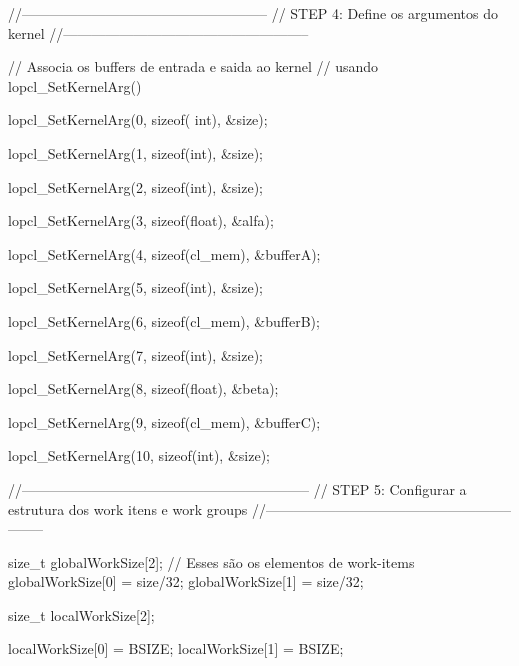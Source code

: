 \begin{DoxyCodeInclude}
{{{{{    \textcolor{comment}{//-----------------------------------------------------}
    \textcolor{comment}{// STEP 4: Define os argumentos do kernel}
    \textcolor{comment}{//-----------------------------------------------------}

    \textcolor{comment}{// Associa os buffers de entrada e saida ao kernel}
    \textcolor{comment}{// usando lopcl\_SetKernelArg()}

    lopcl_SetKernelArg(0, \textcolor{keyword}{sizeof}( \textcolor{keywordtype}{int}), &size);

    lopcl_SetKernelArg(1, \textcolor{keyword}{sizeof}(\textcolor{keywordtype}{int}), &size);

    lopcl_SetKernelArg(2, \textcolor{keyword}{sizeof}(\textcolor{keywordtype}{int}), &size);

    lopcl_SetKernelArg(3, \textcolor{keyword}{sizeof}(\textcolor{keywordtype}{float}), &alfa);

    lopcl_SetKernelArg(4, \textcolor{keyword}{sizeof}(cl\_mem), &bufferA);

    lopcl_SetKernelArg(5, \textcolor{keyword}{sizeof}(\textcolor{keywordtype}{int}), &size);

    lopcl_SetKernelArg(6, \textcolor{keyword}{sizeof}(cl\_mem), &bufferB);

    lopcl_SetKernelArg(7, \textcolor{keyword}{sizeof}(\textcolor{keywordtype}{int}), &size);

    lopcl_SetKernelArg(8, \textcolor{keyword}{sizeof}(\textcolor{keywordtype}{float}), &beta);

    lopcl_SetKernelArg(9, \textcolor{keyword}{sizeof}(cl\_mem), &bufferC);

    lopcl_SetKernelArg(10, \textcolor{keyword}{sizeof}(\textcolor{keywordtype}{int}), &size);


    \textcolor{comment}{//--------------------------------------------------------------}
    \textcolor{comment}{// STEP 5: Configurar a estrutura dos work itens e work groups}
    \textcolor{comment}{//----------------------------------------------------- --------}

    \textcolor{keywordtype}{size\_t} globalWorkSize[2];
    \textcolor{comment}{// Esses são os elementos de work-items}
    globalWorkSize[0] = size/32;
    globalWorkSize[1] = size/32;

    \textcolor{keywordtype}{size\_t} localWorkSize[2];

    localWorkSize[0] = BSIZE;
    localWorkSize[1] = BSIZE;

}}}}}
\end{DoxyCodeInclude}
